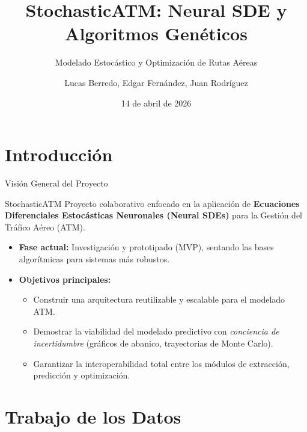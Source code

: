 \documentclass[aspectratio=169]{beamer}
\title[StochasticATM]{StochasticATM: Neural SDE y Algoritmos Genéticos}
\subtitle{Modelado Estocástico y Optimización de Rutas Aéreas}
\author[Berredo, Fernández, Rodríguez]{Lucas Berredo, Edgar Fernández, Juan Rodríguez}
\date{14 de abril de 2026}
\begin{document}
\begin{frame}
  \titlepage
\end{frame}

\section{Introducción}

\begin{frame}{Visión General del Proyecto}
  \begin{block}{StochasticATM}
    Proyecto colaborativo enfocado en la aplicación de \textbf{Ecuaciones Diferenciales Estocásticas Neuronales (Neural SDEs)} para la Gestión del Tráfico Aéreo (ATM).
  \end{block}
  \vspace{0.3cm}
  \begin{itemize}
    \item \textbf{Fase actual:} Investigación y prototipado (MVP), sentando las bases algorítmicas para sistemas más robustos.
    \item \textbf{Objetivos principales:}
    \begin{itemize}
        \item Construir una arquitectura reutilizable y escalable para el modelado ATM.
        \item Demostrar la viabilidad del modelado predictivo con \textit{conciencia de incertidumbre} (gráficos de abanico, trayectorias de Monte Carlo).
        \item Garantizar la interoperabilidad total entre los módulos de extracción, predicción y optimización.
    \end{itemize}
  \end{itemize}
\end{frame}

\section{Trabajo de los Datos}
\end{document}
